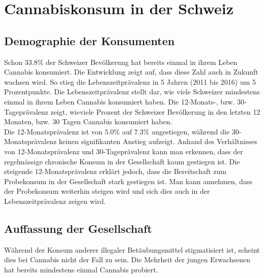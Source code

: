 \documentclass[../main.tex]{subfiles}
\begin{document}

	\section{Cannabiskonsum in der Schweiz}
	
	\subsection{Demographie der Konsumenten}
	Schon $33.8\%$ der Schweizer Bevölkerung hat bereits einmal in ihrem Leben Cannabis konsumiert. 
	Die Entwicklung zeigt auf, dass diese Zahl auch in Zukunft wachsen wird.
	So stieg die Lebenszeitprävalenz in 5 Jahren (2011 bis 2016) um 5 Prozentpunkte.
	Die Lebenszeitprävalenz stellt dar, wie viele Schweizer mindestens einmal in ihrem Leben Cannabis konsumiert haben. 
	Die 12-Monats-, bzw. 30-Tageprävalenz zeigt, wieviele Prozent der Schweizer Bevölkerung in den letzten 12 Monaten, bzw. 30 Tagen Cannabis konsumiert haben.\\
	
	\noindent
	Die 12-Monatsprävalenz ist von $5.0\%$ auf $7.3\%$ angestiegen, während die 30-Monatsprävalenz keinen signifikanten Anstieg aufzeigt.
	Anhand des Verhältnisses von 12-Monatsprävalenz und 30-Tageprävalenz kann man erkennen, dass der regelmässige chronische Konsum in der Gesellschaft kaum gestiegen ist. 
	Die steigende 12-Monatsprävalenz erklärt jedoch, dass die Bereitschaft zum Probekonsum in der Gesellschaft stark gestiegen ist.
	Man kann annehmen, dass der Probekonsum weiterhin steigen wird und sich dies auch in der Lebenszeitprävalenz zeigen wird.
	
	
	
	\subsection{Auffassung der Gesellschaft}
	Während der Konsum anderer illegaler Betäubungsmittel stigmatisiert ist, scheint dies bei Cannabis nicht der Fall zu sein.
	Die Mehrheit der jungen Erwachsenen hat bereits mindestens einmal Cannabis probiert.
	
	 
	
\end{document}
